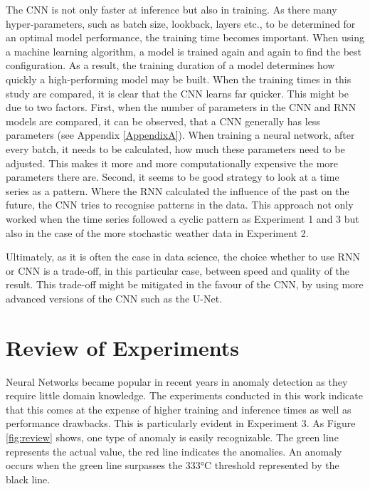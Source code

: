 The CNN is not only faster at inference but also in training. As there many hyper-parameters, such as batch size, lookback, layers etc., to be determined for an optimal model performance, the training time becomes important. When using a machine learning algorithm, a model is trained again and again to find the best configuration. As a result, the training duration of a model determines how quickly a high-performing model may be built. When the training times in this study are compared, it is clear that the CNN learns far quicker. This might be due to two factors.  First, when the number of parameters in the CNN and RNN models are compared, it can be observed, that a CNN generally has less parameters (see Appendix \ref{AppendixA}). When training a neural network, after every batch, it needs to be calculated, how much these parameters need to be adjusted. This makes it more and more computationally expensive the more parameters there are. Second, it seems to be good strategy to look at a time series as a pattern. Where the RNN calculated the influence of the past on the future, the CNN tries to recognise patterns in the data. This approach not only worked when the time series followed a cyclic pattern as Experiment 1 and 3 but also in the case of the more stochastic weather data in Experiment 2.     

Ultimately, as it is often the case in data science, the choice whether to use RNN or CNN is a trade-off, in this particular case, between speed and quality of the result. This trade-off might be mitigated in the favour of the CNN, by using more advanced versions of the CNN such as the U-Net.


\section{Review of Experiments}
Neural Networks became popular in recent years in anomaly detection as they require little domain knowledge. The experiments conducted in this work indicate that this comes at the expense of higher training and inference times as well as performance drawbacks. This is particularly evident in Experiment 3. As Figure \ref{fig:review} shows, one type of anomaly is easily recognizable. The green line represents the actual value, the red line indicates the anomalies. An anomaly occurs when the green line surpasses the 333°C threshold represented by the black line. 

